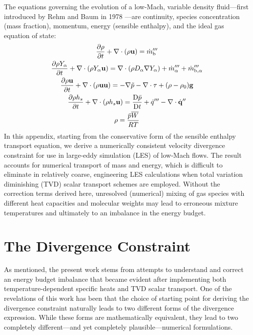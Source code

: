 The equations governing the evolution of a low-Mach, variable density fluid---first introduced by Rehm and Baum in 1978 \cite{Rehm:1}---are continuity, species concentration (mass fraction), momentum, energy (sensible enthalpy), and the ideal gas equation of state:
\begin{gather}
\label{eqn_rho} \frac{\partial \rho}{\partial t} + \nabla\cdot(\rho\mathbf{u}) = \dot{m}_{\rm b}''' \\
\label{eqn_Y_a} \frac{\partial \rho Y_\alpha}{\partial t} + \nabla\cdot(\rho Y_\alpha \mathbf{u}) = \nabla\cdot (\rho D_\alpha \nabla Y_\alpha) + \dot{m}_\alpha^{\prime\prime\prime} + \dot{m}_{{\rm b},\alpha}^{\prime\prime\prime} \\
\label{eqn_u}   \frac{\partial \rho \mathbf{u}}{\partial t} + \nabla\cdot(\rho \mathbf{u} \mathbf{u}) = -\nabla \tilde{p} - \nabla\cdot\mathbf{\tau} + (\rho-\rho_0) \mathbf{g} \\
\label{eqn_h_s} \frac{\partial \rho h_s}{\partial t} + \nabla\cdot(\rho h_s \mathbf{u}) = \frac{\mbox{D} \bar{p}}{\mbox{D} t} + \dot{q}^{\prime\prime\prime} - \nabla\cdot \dot{\mathbf{q}}^{\prime\prime} \\
\label{eqn_eos} \rho = \frac{\bar{p} \overline{W}}{RT}
\end{gather}
In this appendix, starting from the conservative form of the sensible enthalpy transport equation, we derive a numerically consistent velocity divergence constraint for use in large-eddy simulation (LES) of low-Mach flows.  The result accounts for numerical transport of mass and energy, which is difficult to eliminate in relatively coarse, engineering LES calculations when total variation diminishing (TVD) scalar transport schemes are employed.  Without the correction terms derived here, unresolved (numerical) mixing of gas species with different heat capacities and molecular weights may lead to erroneous mixture temperatures and ultimately to an imbalance in the energy budget.

\section{The Divergence Constraint}
\label{div_constraint}

As mentioned, the present work stems from attempts to understand and correct an energy budget imbalance that became evident after implementing both temperature-dependent specific heats and TVD scalar transport. One of the revelations of this work has been that the choice of starting point for deriving the divergence constraint naturally leads to two different forms of the divergence expression.  While these forms are mathematically equivalent, they lead to two completely different---and yet completely plausible---numerical formulations.

